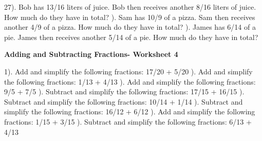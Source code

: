 \documentclass{article}%
\begin{document}
27). Bob has 13/16 liters of juice. Bob then receives another 8/16 liters of juice. How much do they have in total?%
\newline%
\newline%
). Sam has 10/9 of a pizza. Sam then receives another 4/9 of a pizza. How much do they have in total?%
\newline%
\newline%
). James has 6/14 of a pie. James then receives another 5/14 of a pie. How much do they have in total?%
\newline%
\newline%
\newline%
\pagebreak%
\large%
\begin{center}%
\textbf{Adding and Subtracting Fractions- Worksheet 4}%
\newline%
\end{center} \normalsize%
1). Add and simplify the following fractions: 17/20 + 5/20%
\newline%
\newline%
). Add and simplify the following fractions: 1/13 + 4/13%
\newline%
\newline%
). Add and simplify the following fractions: 9/5 + 7/5%
\newline%
\newline%
). Subtract and simplify the following fractions: 17/15 + 16/15%
\newline%
\newline%
). Subtract and simplify the following fractions: 10/14 + 1/14%
\newline%
\newline%
). Subtract and simplify the following fractions: 16/12 + 6/12%
\newline%
\newline%
). Add and simplify the following fractions: 1/15 + 3/15%
\newline%
\newline%
). Subtract and simplify the following fractions: 6/13 + 4/13%
\newline%
\end{document}
